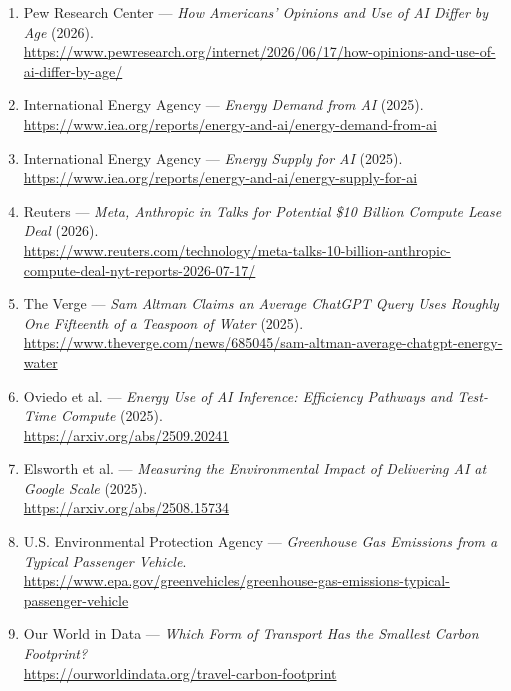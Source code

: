\documentclass{article}
\begin{document}
\begin{enumerate}
    \item Pew Research Center --- \textit{How Americans' Opinions and Use of AI Differ by Age} (2026).\\
    \url{https://www.pewresearch.org/internet/2026/06/17/how-opinions-and-use-of-ai-differ-by-age/}

    \item International Energy Agency --- \textit{Energy Demand from AI} (2025).\\
    \url{https://www.iea.org/reports/energy-and-ai/energy-demand-from-ai}

    \item International Energy Agency --- \textit{Energy Supply for AI} (2025).\\
    \url{https://www.iea.org/reports/energy-and-ai/energy-supply-for-ai}

    \item Reuters --- \textit{Meta, Anthropic in Talks for Potential \$10 Billion Compute Lease Deal} (2026).\\
    \url{https://www.reuters.com/technology/meta-talks-10-billion-anthropic-compute-deal-nyt-reports-2026-07-17/}

    \item The Verge --- \textit{Sam Altman Claims an Average ChatGPT Query Uses Roughly One Fifteenth of a Teaspoon of Water} (2025).\\
    \url{https://www.theverge.com/news/685045/sam-altman-average-chatgpt-energy-water}

    \item Oviedo et al. --- \textit{Energy Use of AI Inference: Efficiency Pathways and Test-Time Compute} (2025).\\
    \url{https://arxiv.org/abs/2509.20241}

    \item Elsworth et al. --- \textit{Measuring the Environmental Impact of Delivering AI at Google Scale} (2025).\\
    \url{https://arxiv.org/abs/2508.15734}

    \item U.S. Environmental Protection Agency --- \textit{Greenhouse Gas Emissions from a Typical Passenger Vehicle}.\\
    \url{https://www.epa.gov/greenvehicles/greenhouse-gas-emissions-typical-passenger-vehicle}

    \item Our World in Data --- \textit{Which Form of Transport Has the Smallest Carbon Footprint?}\\
    \url{https://ourworldindata.org/travel-carbon-footprint}


\end{enumerate}
\end{document}
